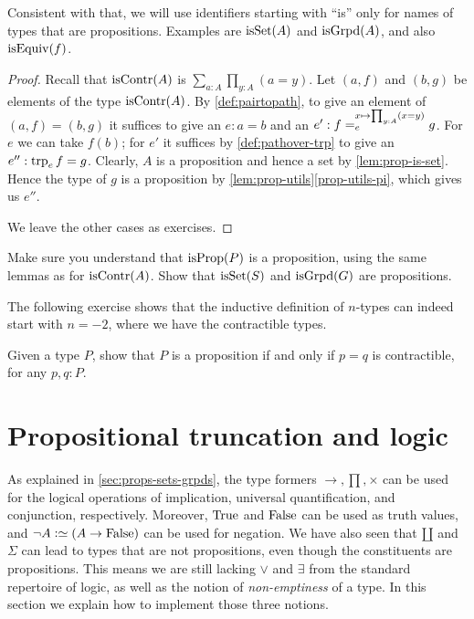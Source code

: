 Consistent with that, we will use identifiers starting with ``is'' only for names of types
that are propositions. Examples are $\isset(A)$ and $\isgrpd(A)$,
and also $\isEq(f)$.

\begin{proof}
Recall that $\iscontr(A)$ is $\sum_{a:A} \prod_{y:A} (a=y)$.
Let $(a,f)$ and $(b,g)$ be elements of the type $\iscontr(A)$.
By \cref{def:pairtopath}, to give an element of $(a,f) = (b,g)$ it suffices
to give an $e : a=b$ and an $e' : \pathover{f}{x\mapsto\prod_{y:A} (x=y)}{e}{g}$.
For $e$ we can take $f(b)$; for $e'$ it suffices by \cref{def:pathover-trp}
to give an $e'' : \trp e f = g$. Clearly, $A$ is a proposition and hence
a set by \cref{lem:prop-is-set}. Hence the type of $g$ is a proposition
by \cref{lem:prop-utils}\ref{prop-utils-pi}, which gives us $e''$.

We leave the other cases as exercises.
\end{proof}

\begin{xca}\label{xca:isX-is-prop}
Make sure you understand that $\isprop(P)$ is a proposition,
using the same lemmas as for $\iscontr(A)$.
Show that $\isset(S)$ and $\isgrpd(G)$ are propositions.
\end{xca}

The following exercise shows that the inductive definition of $n$-types can
indeed start with $n=-2$, where we have the contractible types.

\begin{xca}\label{xca:prop-contractible=}
Given a type $P$, show that $P$ is a proposition if and only if $p=q$ is contractible,
for any $p, q: P$.
\end{xca}


\section{Propositional truncation and logic}
\label{sec:prop-trunc}

As explained in \cref{sec:props-sets-grpds},
the type formers $\to,\prod,\times$
can be used for the logical operations of implication,
universal quantification, and conjunction, respectively.
Moreover, $\mathrm{True}$ and $\mathrm{False}$ can be used as truth values,
and $\neg A \defeq (A\to\false)$ can be used for negation.
We have also seen that ${\amalg}$ and $\Sigma$ can lead to types
that are not propositions, even though the constituents are
propositions. This means we are still lacking $\vee$ and $\exists$
from the standard repertoire of logic, as well as the notion of \emph{non-emptiness} of a type.
In this section we explain how to implement those three notions.

